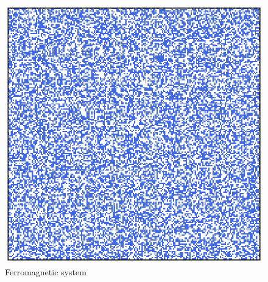 \begin{figure}[h]
\begin{minipage}[t]{0.45\textwidth}
    \end{minipage}
    \hfill
    \begin{minipage}[t]{\textwidth}
        \centering
        \includegraphics[scale=0.45]{./images/ising/T_100_ferro.eps}
    \end{minipage}
    \caption{Ferromagnetic system}
    \label{fig:MC_single_final_state_ferro}
\end{figure}
